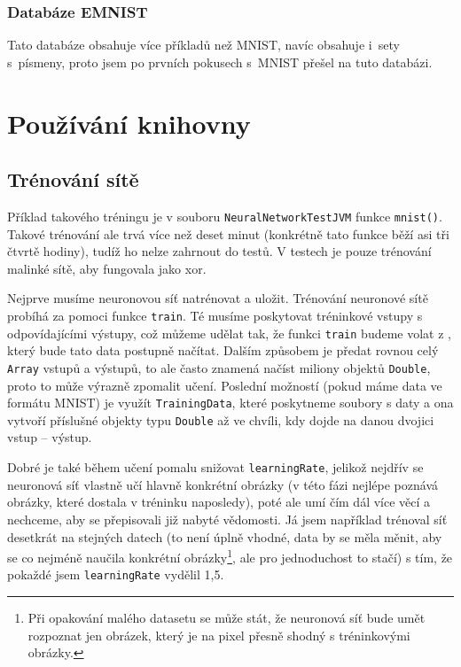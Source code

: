 \documentclass[12pt]{report}			%
\newcommand{\glsref}[1]{\glsdisp{#1}{\phantom{}}}
\begin{document}
				\subsection{Databáze EMNIST} \label{EMNIST}
					 \parencite[přeloženo]{article:EMNIST}
					
					Tato databáze obsahuje více příkladů než MNIST, navíc obsahuje i~sety s~písmeny, proto jsem po prvních pokusech s~MNIST přešel na tuto databázi.

		\chapter{Používání knihovny}
			\section{Trénování sítě}
				Příklad takového tréningu je v souboru \verb!NeuralNetworkTestJVM! funkce \verb!mnist()!. Takové trénování ale trvá více než deset minut (konkrétně tato funkce běží asi tři čtvrtě hodiny), tudíž ho nelze zahrnout do testů. V testech je pouze trénování malinké sítě, aby fungovala jako \gls{xor}.
			
				Nejprve musíme neuronovou síť natrénovat a uložit. Trénování neuronové sítě probíhá za pomoci funkce \verb!train!. Té musíme poskytovat tréninkové vstupy s odpovídajícími výstupy, což můžeme udělat tak, že funkci \verb!train! budeme volat z , který bude tato data postupně načítat. Dalším způsobem je předat rovnou celý \glsref{Array}\verb!Array! vstupů a výstupů, to ale často znamená načíst miliony objektů  \glsref{Double}\verb!Double!, proto to může výrazně zpomalit učení. Poslední možností (pokud máme data ve formátu MNIST) je využít  \verb!TrainingData!, které poskytneme soubory s daty a ona vytvoří příslušné objekty \gls{typ}u \glsref{Double}\verb!Double! až ve chvíli, kdy dojde na danou dvojici vstup -- výstup.
				
				Dobré je také během učení pomalu snižovat \verb!learningRate!, jelikož nejdřív se neuronová síť vlastně učí hlavně konkrétní obrázky (v této fázi nejlépe poznává obrázky, které dostala v tréninku naposledy), poté ale umí čím dál více věcí a nechceme, aby se přepisovali již nabyté vědomosti. Já jsem například trénoval síť desetkrát na stejných datech (to není úplně vhodné, data by se měla měnit, aby se co nejméně naučila konkrétní obrázky\footnote{Při opakování malého datasetu se může stát, že neuronová síť bude umět rozpoznat jen obrázek, který je na pixel přesně shodný s tréninkovými obrázky.}, ale pro jednoduchost to stačí) s tím, že pokaždé jsem \verb!learningRate! vydělil 1,5.
				
\end{document}

